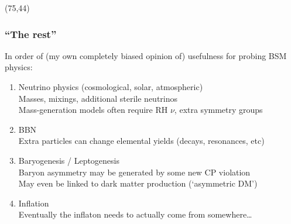 \documentclass[xcolor=dvipsnames]{beamer}
\newcommand{\cblue}[1]{{\color[rgb]{0.1, 0.0, 0.6} #1}}
\begin{document}
\begin{frame}
  \begin{textblock}{40}(75,44)
  \end{textblock}

\end{frame}


\begin{frame}
\frametitle{``The rest''}

In order of (my own completely biased opinion of) usefulness for probing BSM physics:

\begin{enumerate}
\item{\cblue{Neutrino physics (cosmological, solar, atmospheric)} \\\hspace{3mm}\footnotesize Masses, mixings, additional sterile neutrinos\\\hspace{3mm}Mass-generation models often require RH $\nu$, extra symmetry groups}
\item{\cblue{BBN} \\\hspace{3mm}\footnotesize Extra particles can change elemental yields (decays, resonances, etc)}
\item{\cblue{Baryogenesis / Leptogenesis} \\\hspace{3mm}\footnotesize Baryon asymmetry may be generated by some new CP violation\\\hspace{3mm}May even be linked to dark matter production (`asymmetric DM')}
\item{\cblue{Inflation} \\\hspace{3mm}\footnotesize Eventually the inflaton needs to actually come from somewhere\ldots}
\end{enumerate}

\end{frame}
\end{document}
